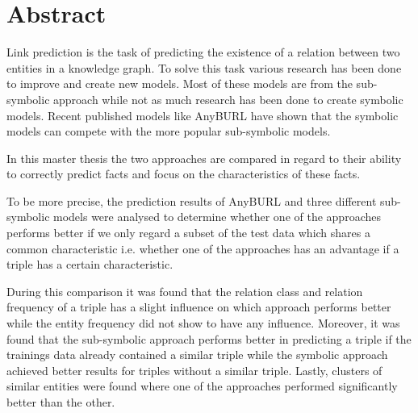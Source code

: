 \chapter*{Abstract}
\label{cha:abstract}
Link prediction is the task of predicting the existence of a relation between two entities in a knowledge graph. To solve this task various research has been done to improve and create new models. Most of these models are from the sub-symbolic approach while not as much research has been done to create symbolic models. Recent published models like AnyBURL have shown that the symbolic models can compete with the more popular sub-symbolic models. 

In this master thesis the two approaches are compared in regard to their ability to correctly predict facts and focus on the characteristics of these facts. 

To be more precise, the prediction results of AnyBURL and three different sub-symbolic models were analysed to determine whether one of the approaches performs better if we only regard a subset of the test data which shares a common characteristic i.e. whether one of the approaches has an advantage if a triple has a certain characteristic. 

During this comparison it was found that the relation class and relation frequency of a triple has a slight influence on which approach performs better while the entity frequency did not show to have any influence. Moreover, it was found that the sub-symbolic approach performs better in predicting a triple if the trainings data already contained a similar triple while the symbolic approach achieved better results for triples without a similar triple. Lastly, clusters of similar entities were found where one of the approaches performed significantly better than the other. 